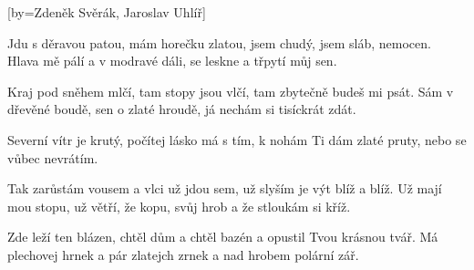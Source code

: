 [by={Zdeněk Svěrák, Jaroslav Uhlíř}]

\beginverse{}
Jdu s děravou patou, mám horečku zlatou,
jsem chudý, jsem sláb, nemocen.
Hlava mě pálí a v modravé dáli,
se leskne a třpytí můj sen.
\endverse{}

\beginverse{}
Kraj pod sněhem mlčí, tam stopy jsou vlčí,
tam zbytečně budeš mi psát.
Sám v dřevěné boudě, sen o zlaté hroudě,
já nechám si tisíckrát zdát. 
\endverse{}

\beginchorus{}
Severní vítr je krutý, počítej lásko má s tím,
k nohám Ti dám zlaté pruty, nebo se vůbec nevrátím.
\endchorus{}

\beginverse{}
Tak zarůstám vousem a vlci už jdou sem,
už slyším je výt blíž a blíž.
Už mají mou stopu, už větří, že kopu,
svůj hrob a že stloukám si kříž.
\endverse{}

\beginverse{}
Zde leží ten blázen, chtěl dům a chtěl bazén
a opustil Tvou krásnou tvář.
Má plechovej hrnek a pár zlatejch zrnek
a nad hrobem polární zář.
\endverse{}

\beginchorus{}

\endchorus{}

\endsong{}
